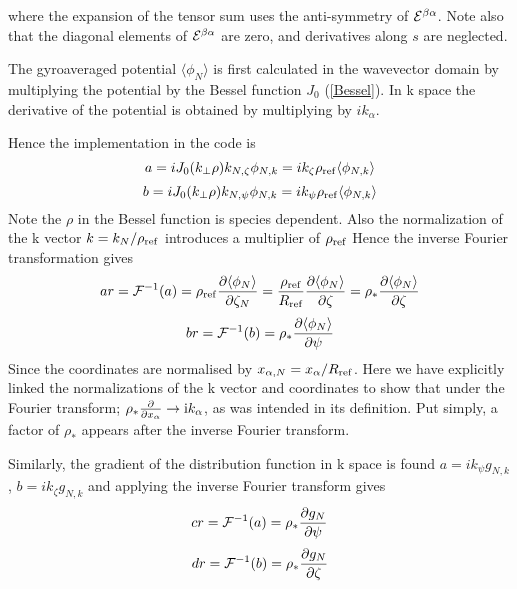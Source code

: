 where the expansion of the tensor sum uses the anti-symmetry of ${\cal E}^{\beta \alpha}$.  Note also that the diagonal elements of ${\cal E}^{\beta \alpha}$ are zero, and derivatives along $s$ are neglected. 

The gyroaveraged potential $\langle \phi_N \rangle$ is first calculated in the wavevector domain by multiplying the potential by the Bessel function $J_0$ (\ref {Bessel}). In k space the derivative of the potential is obtained by multiplying by $ik_\alpha$. 

Hence the implementation in the code is
\begin{equation}
a = i J_{0}(k_{\perp}\rho) k_{N,\zeta} \phi_{N,k} = ik_{\zeta}\rho_{\rm ref}{\langle \phi_{N,k} \rangle} 
\end{equation}
\begin{equation}
b = i J_{0}(k_{\perp}\rho) k_{N,\psi} \phi_{N,k} = ik_{\psi}\rho_{\rm ref}{\langle \phi_{N,k} \rangle} 
\end{equation}
Note the $\rho$ in the Bessel function is species dependent.  Also the normalization of the k vector $k = {k_N / \rho_{\rm ref}}$ introduces a multiplier of $\rho_{\rm ref}$
Hence the inverse Fourier transformation gives
\begin{equation}
ar = \mathcal{F}^{-1}(a) =  \rho_{\rm ref} {\partial {\langle \phi_N \rangle} \over \partial \zeta_{N}} = {\rho_{\rm ref} \over R_{\rm ref}} {\partial {\langle \phi_N \rangle} \over \partial \zeta} =  \rho_* {\partial {\langle \phi_N \rangle} \over \partial \zeta}
\end{equation}
\begin{equation}
br = \mathcal{F}^{-1}(b) =  \rho_* {\partial {\langle \phi_N \rangle} \over \partial \psi}
\end{equation}
Since the coordinates are normalised by $x_{\alpha,N} = {x_{\alpha} \slash R_{\rm ref}}$.  Here we have explicitly linked the normalizations of the k vector and coordinates to show that under the Fourier transform; $\rho_* {\partial \over \partial x_\alpha} \rightarrow {\rm i} k_\alpha$, as was intended in its definition. Put simply, a factor of $\rho_{*}$ appears after the inverse Fourier transform.

Similarly, the gradient of the distribution function in k space is found $a = i k_\psi g_{N,k}$, $b = i k_\zeta g_{N,k}$
and applying the inverse Fourier transform gives
\begin{equation}
cr = \mathcal{F}^{-1}(a) = \rho_* {\partial g_N \over \partial \psi}
\end{equation}
\begin{equation}
dr = \mathcal{F}^{-1}(b) = \rho_* {\partial g_N \over \partial \zeta}
\end{equation}


